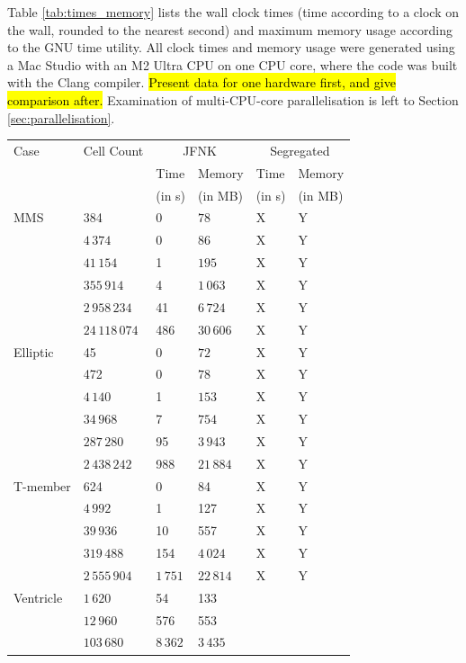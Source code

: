\documentclass[sn-mathphys,Numbered]{sn-jnl}%
\begin{document}
Table \ref{tab:times_memory} lists the wall clock times (time according to a clock on the wall, rounded to the nearest second) and maximum memory usage according to the GNU time utility.
All clock times and memory usage were generated using a Mac Studio with an M2 Ultra CPU on one CPU core, where the code was built with the Clang compiler.
\hl{Present data for one hardware first, and give comparison after.}
Examination of multi-CPU-core parallelisation is left to Section \ref{sec:parallelisation}.
\begin{table}[htb]
	\centering
		\begin{tabular}{ll|ll|ll}
			\hline
			Case & Cell Count & \multicolumn{2}{c|}{JFNK} & \multicolumn{2}{c}{Segregated} \\
			     &            & Time & Memory & Time & Memory \\
			     &            & (in s) & (in MB) & (in s) & (in MB) \\
			\hline 
			MMS & 384 & 0 & $78$ & X & Y \\
				& $4\,374$ & 0 & $86$ & X & Y \\
				& $41\,154$ & 1 & $195$ & X & Y \\
				&  $355\,914$ & 4 & $1\,063$ & X & Y \\
				& $2\,958\,234$ & 41 & $6\,724$ & X & Y \\
				& $24\,118\,074$ & 486 & $30\,606$ & X & Y \\
			\hline
			Elliptic & 45 & 0 & $72$ & X & Y \\
				& 472 & 0 & $78$ & X & Y \\
				& $4\,140$ & 1 & $153$ & X & Y \\
				& $34\,968$ & 7 & $754$ & X & Y \\
				& $287\,280$ & 95 & $3\,943$ & X & Y \\
				& $2\,438\,242$ & 988 & $21\,884$ & X & Y \\
			\hline
			T-member & 624& 0 & 84 & X & Y \\
				& $4\,992$ & 1 & 127 & X & Y \\
				& $39\,936$ & 10 & 557 & X & Y \\
				& $319\,488$ & 154 & $4\,024$ & X & Y \\
				& $2\,555\,904$ & $1\,751$ & $22\,814$ & X & Y \\
			\hline
			Ventricle & $1\,620$ & 54 & 133 & & \\
				& $12\,960$ & 576 & 553 & & \\
				& $103\,680$ & $8\,362$ & $3\,435$ & & \\

\end{tabular}
\end{table}
\end{document}
